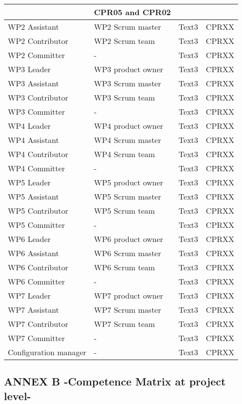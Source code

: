 \documentclass{template/openetcs_article}
\begin{document}
\begin{flushleft}
\begin{supertabular}{|m{2cm}|m{2cm}|m{9cm}|m{2cm}|}
\begin{itemize}
\end{itemize} &
CPR05 and CPR02\\\hline
WP2 Assistant &
WP2 Scrum master &
Text3 &
CPRXX\\\hline
WP2 Contributor &
WP2 Scrum team  &
Text3 &
CPRXX\\\hline
WP2 Committer &
- &
Text3 &
CPRXX\\\hline
WP3 Leader &
WP3 product owner &
Text3 &
CPRXX\\\hline
WP3 Assistant &
WP3 Scrum master &
Text3 &
CPRXX\\\hline
WP3 Contributor &
WP3 Scrum team  &
Text3 &
CPRXX\\\hline
WP3 Committer &
- &
Text3 &
CPRXX\\\hline
WP4 Leader &
WP4 product owner &
Text3 &
CPRXX\\\hline
WP4 Assistant &
WP4 Scrum master &
Text3 &
CPRXX\\\hline
WP4 Contributor &
WP4 Scrum team  &
Text3 &
CPRXX\\\hline
WP4 Committer &
- &
Text3 &
CPRXX\\\hline
WP5 Leader &
WP5 product owner &
Text3 &
CPRXX\\\hline
WP5 Assistant &
WP5 Scrum master &
Text3 &
CPRXX\\\hline
WP5 Contributor &
WP5 Scrum team  &
Text3 &
CPRXX\\\hline
WP5 Committer &
- &
Text3 &
CPRXX\\\hline
WP6 Leader &
WP6 product owner &
Text3 &
CPRXX\\\hline
WP6 Assistant &
WP6 Scrum master &
Text3 &
CPRXX\\\hline
WP6 Contributor &
WP6 Scrum team  &
Text3 &
CPRXX\\\hline
WP6 Committer &
- &
Text3 &
CPRXX\\\hline
WP7 Leader &
WP7 product owner &
Text3 &
CPRXX\\\hline
WP7 Assistant &
WP7 Scrum master &
Text3 &
CPRXX\\\hline
WP7 Contributor &
WP7 Scrum team  &
Text3 &
CPRXX\\\hline
WP7 Committer &
- &
Text3 &
CPRXX\\\hline
Configuration manager &
- &
Text3 &
CPRXX\\\hline
\end{supertabular}
\end{flushleft}

\subsection{ANNEX B -Competence Matrix at project level-}
\end{document}
